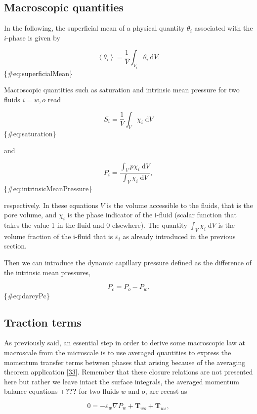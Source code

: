 \documentclass[]{article}
\begin{document}
\hypertarget{macroscopic-quantities}{%
\subsection{Macroscopic quantities}\label{macroscopic-quantities}}

In the following, the superficial mean of a physical quantity
\(\theta_i\) associated with the \(i\)-phase is given by

\[
\left\langle \theta_{i}\right\rangle =\frac{1}{V}\int_{V_{i}}\theta_{i}\:\mathrm{d}V.
\] \{\#eq:superficialMean\}

Macroscopic quantities such as saturation and intrinsic mean pressure
for two fluids \(i=w,o\) read

\[
S_i = \frac{1}{V} \int_{V}\chi_{i}\;\mathrm{d}V
\] \{\#eq:saturation\}

and

\[
P_{i}=\frac{\int_{V}p\chi_{i}\;\mathrm{d}V}{\int_{V}\chi_{i}\;\mathrm{d}V},
\] \{\#eq:intrinsicMeanPressure\}

respectively. In these equations \(V\) is the volume accessible to the
fluids, that is the pore volume, and \(\chi_i\) is the phase indicator
of the i-fluid (scalar function that takes the value 1 in the fluid and
0 elsewhere). The quantity \(\int_{V}\chi_{i}\;\mathrm{d}V\) is the
volume fraction of the i-fluid that is \(\varepsilon_{i}\) as already
introduced in the previous section.

Then we can introduce the dynamic capillary pressure defined as the
difference of the intrinsic mean pressures,

\[
P_{c}=P_{o}-P_{w}.
\] \{\#eq:darcyPc\}

\hypertarget{traction-terms}{%
\subsection{Traction terms}\label{traction-terms}}

As previously said, an essential step in order to derive some
macroscopic law at macroscale from the microscale is to use averaged
quantities to express the momentum transfer terms between phases that
arising because of the averaging theorem application
{[}\protect\hyperlink{ref-Whitaker2013}{33}{]}. Remember that these
closure relations are not presented here but rather we leave intact the
surface integrals, the averaged momentum balance equations +\textbf{???}
for two fluids \(w\) and \(o\), are recast as

\[
0=-\varepsilon_{w}\nabla P_{w}+\mathbf{T}_{wo}+\mathbf{T}_{ws}, 
\]
\end{document}
